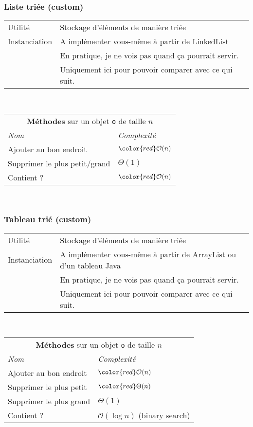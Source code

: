 \documentclass[8pt,aspectratio=169]{beamer}
\begin{document}
\begin{frame}
\frametitle{Liste triée (custom)}
\centering
\begin{tabular}{ll}
	Utilité & Stockage d'éléments de manière triée\\
	Instanciation & A implémenter vous-même à partir de LinkedList\\
	& \color{red} En pratique, je ne vois pas quand ça pourrait servir. \\
	& \color{red} Uniquement ici pour pouvoir comparer avec ce qui suit.
	
\end{tabular}\\
\vspace{0.5cm}
\centering
\begin{tabular}{ll}
	\multicolumn{2}{c}{\textbf{Méthodes} sur un objet \texttt{o} de taille $n$} \\
	\textit{Nom} & \textit{Complexité} \\
	Ajouter au bon endroit & $\color{red}\mathcal{O}(n)$\\
    Supprimer le plus petit/grand & $\Theta(1)$\\
    Contient ? & $\color{red}\mathcal{O}(n)$\\
\end{tabular}\\
\vspace{0.5cm}
\end{frame}

\begin{frame}
\frametitle{Tableau trié (custom)}
\centering
\begin{tabular}{ll}
	Utilité & Stockage d'éléments de manière triée\\
	Instanciation & A implémenter vous-même à partir de ArrayList ou d'un tableau Java\\
	& \color{red} En pratique, je ne vois pas quand ça pourrait servir. \\
	& \color{red} Uniquement ici pour pouvoir comparer avec ce qui suit.
	
\end{tabular}\\
\vspace{0.5cm}
\centering
\begin{tabular}{ll}
	\multicolumn{2}{c}{\textbf{Méthodes} sur un objet \texttt{o} de taille $n$} \\
	\textit{Nom} & \textit{Complexité} \\
	Ajouter au bon endroit & $\color{red}\mathcal{O}(n)$\\
	Supprimer le plus petit & $\color{red}\Theta(n)$\\
	Supprimer le plus grand & $\Theta(1)$\\
	Contient ? & $\mathcal{O}(\log n)$ (binary search)\\
\end{tabular}\\
\vspace{0.5cm}
\end{frame}
\end{document}
